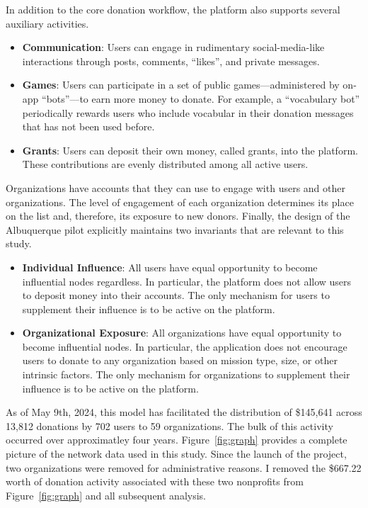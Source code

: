 In addition to the core donation workflow, the platform also supports several auxiliary activities. 

\begin{itemize}
  \item \textbf{Communication}: Users can engage in rudimentary social-media-like interactions through posts, comments, ``likes'', and private messages.
  \item \textbf{Games}: Users can participate in a set of public games---administered by on-app ``bots''---to earn more money to donate. For example, a ``vocabulary bot'' periodically rewards users who include vocabular in their donation messages that has not been used before.
  \item \textbf{Grants}: Users can deposit their own money, called grants, into the platform. These contributions are evenly distributed among all active users.
\end{itemize}

Organizations have accounts that they can use to engage with users and other organizations.
The level of engagement of each organization determines its place on the list and, therefore, its exposure to new donors.
Finally, the design of the Albuquerque pilot explicitly maintains two invariants that are relevant to this study.

\begin{itemize}

  \item \textbf{Individual Influence}: All users have equal opportunity to become influential nodes regardless.
In particular, the platform does not allow users to deposit money into their accounts.
The only mechanism for users to supplement their influence is to be active on the platform.

  \item \textbf{Organizational Exposure}: All organizations have equal opportunity to become influential nodes.
In particular, the application does not encourage users to donate to any organization based on mission type, size, or other intrinsic factors.
The only mechanism for organizations to supplement their influence is to be active on the platform.

\end{itemize}

As of May 9th, 2024, this model has facilitated the distribution of \$145,641 across 13,812 donations by 702 users to 59 organizations.
The bulk of this activity occurred over approximatley four years.
Figure~\ref{fig:graph} provides a complete picture of the network data used in this study.
Since the launch of the project, two organizations were removed for administrative reasons.
I removed the \$667.22 worth of donation activity associated with these two nonprofits from Figure~\ref{fig:graph} and all subsequent analysis.

